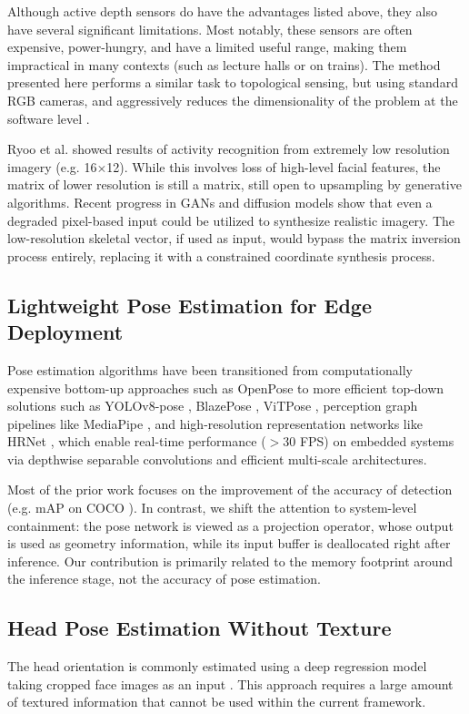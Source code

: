 \documentclass[conference]{IEEEtran}
\begin{document}
Although active depth sensors do have the advantages listed above, they also have several significant limitations. Most notably, these sensors are often expensive, power-hungry, and have a limited useful range, making them impractical in many contexts (such as lecture halls or on trains). The method presented here performs a similar task to topological sensing, but using standard RGB cameras, and aggressively reduces the dimensionality of the problem at the software level \cite{b23}.

Ryoo et al. \cite{b2} showed results of activity recognition from extremely low resolution imagery (e.g. 16$\times$12). While this involves loss of high-level facial features, the matrix of lower resolution is still a matrix, still open to upsampling by generative algorithms. Recent progress in GANs and diffusion models show that even a degraded pixel-based input could be utilized to synthesize realistic imagery. The low-resolution skeletal vector, if used as input, would bypass the matrix inversion process entirely, replacing it with a constrained coordinate synthesis process.

\subsection{Lightweight Pose Estimation for Edge Deployment}
Pose estimation algorithms have been transitioned from computationally expensive bottom-up approaches such as OpenPose \cite{b6} to more efficient top-down solutions such as YOLOv8-pose \cite{b10}, BlazePose \cite{b8}, ViTPose \cite{b9}, perception graph pipelines like MediaPipe \cite{b7}, and high-resolution representation networks like HRNet \cite{b12}, which enable real-time performance ($>$30 FPS) on embedded systems via depthwise separable convolutions and efficient multi-scale architectures.

Most of the prior work focuses on the improvement of the accuracy of detection (e.g. mAP on COCO \cite{b11}). In contrast, we shift the attention to system-level containment: the pose network is viewed as a projection operator, whose output is used as geometry information, while its input buffer is deallocated right after inference. Our contribution is primarily related to the memory footprint around the inference stage, not the accuracy of pose estimation.

\subsection{Head Pose Estimation Without Texture}
The head orientation is commonly estimated using a deep regression model taking cropped face images as an input \cite{b13, b14}. This approach requires a large amount of textured information that cannot be used within the current framework.
\end{document}

